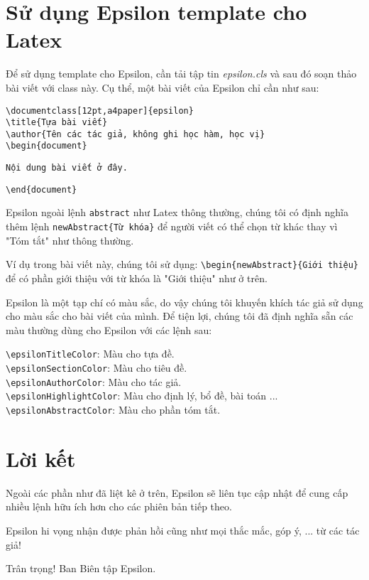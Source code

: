 \documentclass[12pt,a4paper]{epsilon}
\begin{document}
\section{Sử dụng Epsilon template cho Latex}
Để sử dụng template cho Epsilon, cần tải tập tin \textit{epsilon.cls} và sau đó soạn thảo bài viết với class này. Cụ thể, một bài viết của Epsilon chỉ cần như sau:

\texttt{\textbackslash documentclass[12pt,a4paper]\{epsilon\}}\\
\texttt{\textbackslash title\{Tựa bài viết\}}\\
\texttt{\textbackslash author\{Tên các tác giả, không ghi học hàm, học vị\}}\\
\texttt{\textbackslash begin\{document\}}

\texttt{Nội dung bài viết ở đây.}

\texttt{\textbackslash end\{document\}}

Epsilon ngoài lệnh \texttt{abstract} như Latex thông thường, chúng tôi có định nghĩa thêm lệnh \texttt{newAbstract\{Từ khóa\}} để người viết có thể chọn từ khác thay vì "Tóm tắt" như thông thường.

Ví dụ trong bài viết này, chúng tôi sử dụng: 
\texttt{\textbackslash begin\{newAbstract\}\{Giới thiệu\}} để có phần giới thiệu với từ khóa là "Giới thiệu" như ở trên.

Epsilon là một tạp chí có màu sắc, do vậy chúng tôi khuyến khích tác giả sử dụng cho màu sắc cho bài viết của mình. Để tiện lợi, chúng tôi đã định nghĩa sẵn các màu thường dùng cho Epsilon với các lệnh sau:

\texttt{\textbackslash epsilonTitleColor}: Màu cho tựa đề.\\
\texttt{\textbackslash epsilonSectionColor}: Màu cho tiêu đề.\\
\texttt{\textbackslash epsilonAuthorColor}: Màu cho tác giả.\\
\texttt{\textbackslash epsilonHighlightColor}: Màu cho định lý, bổ đề, bài toán ...\\
\texttt{\textbackslash epsilonAbstractColor}: Màu cho phần tóm tắt.

\section*{Lời kết}
Ngoài các phần như đã liệt kê ở trên, Epsilon sẽ liên tục cập nhật để cung cấp nhiều lệnh hữu ích hơn cho các phiên bản tiếp theo. 

Epsilon hi vọng nhận được phản hồi cũng như mọi thắc mắc, góp ý, ... từ các tác giả!

Trân trọng! Ban Biên tập Epsilon.
 
\end{document}
